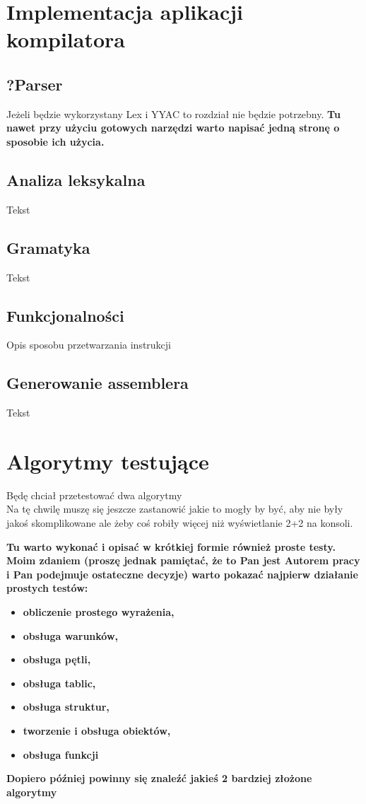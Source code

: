 \documentclass[a4paper]{article}
\begin{document}
\section{Implementacja aplikacji kompilatora}
\subsection{?Parser}
Jeżeli będzie wykorzystany Lex i YYAC to rozdział nie będzie potrzebny.
\textbf{Tu nawet przy użyciu gotowych narzędzi warto napisać jedną stronę o sposobie ich użycia.}

\subsection{Analiza leksykalna}
Tekst
\subsection{Gramatyka}
Tekst
\subsection{Funkcjonalności}
Opis sposobu przetwarzania instrukcji
\subsection{Generowanie assemblera}
Tekst

\section{Algorytmy testujące}
Będę chciał przetestować dwa algorytmy
\\
Na tę chwilę muszę się jeszcze zastanowić jakie to mogły by być, aby nie były jakoś skomplikowane ale żeby coś robiły więcej niż wyświetlanie 2+2 na konsoli.

\textbf{Tu warto wykonać i opisać w krótkiej formie również proste testy. Moim zdaniem (proszę jednak pamiętać, że to Pan jest Autorem pracy i Pan podejmuje ostateczne decyzje) warto pokazać najpierw działanie prostych testów:}

\begin{itemize}
  \item \textbf{obliczenie prostego wyrażenia,}
  \item \textbf{obsługa warunków,}
  \item \textbf{obsługa pętli,}
  \item \textbf{obsługa tablic,}
  \item \textbf{obsługa struktur,}
  \item \textbf{tworzenie i obsługa obiektów,}
  \item \textbf{obsługa funkcji}
\end{itemize}
\textbf{Dopiero później powinny się znaleźć jakieś 2 bardziej złożone algorytmy}
\end{document}
